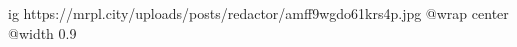 
 
 
 
 

\ifcmt
  ig https://mrpl.city/uploads/posts/redactor/amff9wgdo61krs4p.jpg
  @wrap center
  @width 0.9
\fi
